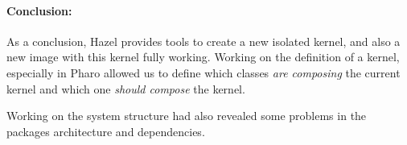 \paragraph{Conclusion:} As a conclusion, Hazel provides tools to create a new isolated kernel, and also a new image with this kernel fully working. Working on the definition of a kernel, especially in \gls{Pharo} allowed us to define which classes \emph{are composing} the current kernel and which one \emph{should compose} the kernel. 

Working on the system structure had also revealed some problems in the packages architecture and dependencies. 